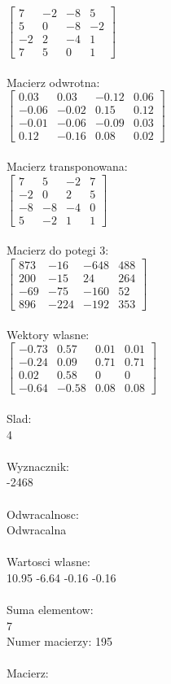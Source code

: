\documentclass[a4paper,12pt]{article}
\begin{document}
$\begin{bmatrix} 7&-2&-8&5\\5&0&-8&-2\\-2&2&-4&1\\7&5&0&1 \end{bmatrix}$
\\
\\
Macierz odwrotna:\\

$\begin{bmatrix} 0.03&0.03&-0.12&0.06\\-0.06&-0.02&0.15&0.12\\-0.01&-0.06&-0.09&0.03\\0.12&-0.16&0.08&0.02 \end{bmatrix}$
\\
\\
Macierz transponowana:\\

$\begin{bmatrix} 7&5&-2&7\\-2&0&2&5\\-8&-8&-4&0\\5&-2&1&1 \end{bmatrix}$
\\
\\
Macierz do potegi 3:\\

$\begin{bmatrix} 873&-16&-648&488\\200&-15&24&264\\-69&-75&-160&52\\896&-224&-192&353 \end{bmatrix}$
\\
\\
Wektory wlasne:\\

$\begin{bmatrix} -0.73&0.57&0.01&0.01\\-0.24&0.09&0.71&0.71\\0.02&0.58&0&0\\-0.64&-0.58&0.08&0.08 \end{bmatrix}$
\\
\\
Slad:\\
4
\\
\\
Wyznacznik:\\
-2468
\\
\\
Odwracalnosc:\\
Odwracalna
\\
\\
Wartosci wlasne:\\
10.95 -6.64 -0.16 -0.16
\\
\\
Suma elementow:\\
7
\\
\newpage
Numer macierzy:
195
\\
\\
Macierz:\\
\end{document}
